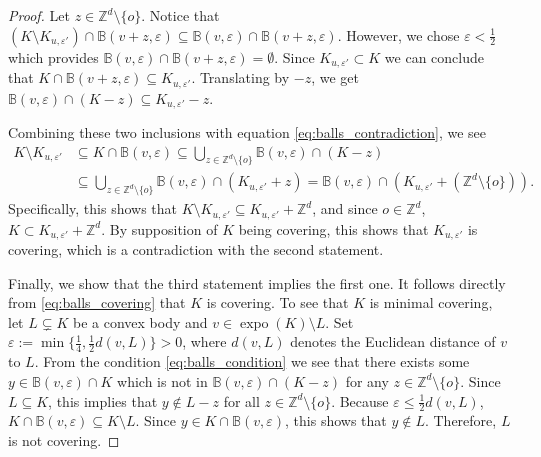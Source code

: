 \documentclass[10pt,a4paper]{amsart}
\DeclareMathOperator{\expo}{expo}
\newcommand{\ZZ}{\mathbb{Z}}
\newcommand{\ball}{\mathbb{B}}
\newcommand{\origin}{o}
\begin{document}
\begin{proof}
 Let $z\in \ZZ^d\setminus \{ \origin\}$. Notice that $(K\setminus K_{u, \varepsilon'})\cap \ball(v+z, \varepsilon)\subseteq \ball(v,\varepsilon)\cap \ball(v+z,\varepsilon)$. However, we chose $\varepsilon < \frac{1}{2}$ which provides $\ball(v, \varepsilon)\cap\ball(v+z,\varepsilon)=\emptyset$. Since $K_{u,\varepsilon'}\subset K$ we can conclude that $K\cap \ball(v+z, \varepsilon)\subseteq K_{u,\varepsilon'}$. Translating by $-z$, we get \(\ball(v,\varepsilon)\cap(K-z)\subseteq K_{u,\varepsilon'}-z\).
 
Combining these two inclusions with equation \eqref{eq:balls_contradiction}, we see
\[
\begin{split}
K\setminus K_{u,\varepsilon'}&\subseteq K\cap \ball(v,\varepsilon)\subseteq \bigcup\limits_{z\in \ZZ^d\setminus\{\origin\}}\ball(v,\varepsilon)\cap(K-z)\\
&\subseteq \bigcup\limits_{z\in \ZZ^d\setminus\{\origin\}}\ball(v,\varepsilon)\cap(K_{u,\varepsilon'}+z)=\ball(v,\varepsilon)\cap (K_{u,\varepsilon'}+(\ZZ^d\setminus\{\origin\})).
\end{split}
\]
Specifically, this shows that $K\setminus K_{u, \varepsilon'}\subseteq K_{u, \varepsilon'}+\ZZ^d$, and since $\origin\in \ZZ^d$, $K\subset K_{u, \varepsilon'}+\ZZ^d$. By supposition of $K$ being covering, this shows that $K_{u, \varepsilon'}$ is covering, which is a contradiction with the second statement. 

Finally, we show that the third statement implies the first one. It follows directly from \eqref{eq:balls_covering} that $K$ is covering. To see that $K$ is minimal covering, let $L\subsetneq K$ be a convex body and $v\in \expo(K)\setminus L$. Set $\varepsilon:=\min \{ \frac{1}{4}, \frac{1}{2}d(v,L)\}>0$, where $d(v,L)$ denotes the Euclidean distance of $v$ to $L$. From the condition \eqref{eq:balls_condition} we see that there exists some $y\in \ball(v,\varepsilon)\cap K$ which is not in $\ball(v,\varepsilon)\cap (K-z)$ for any $z\in \ZZ^d\setminus\{\origin\}$. Since $L\subseteq K$, this implies that $y\notin L-z$ for all $z\in \ZZ^d\setminus \{\origin\}$. Because $\varepsilon\leq\frac{1}{2}d(v,L)$, $K\cap \ball(v,\varepsilon)\subseteq K\setminus L$. Since $y\in K\cap \ball(v,\varepsilon)$, this shows that $y\notin L$. Therefore, $L$ is not covering.
\end{proof}
\end{document}
